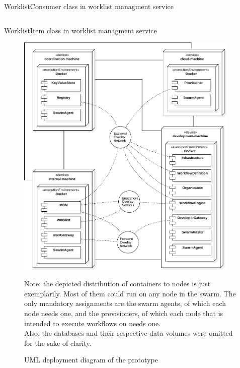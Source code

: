     \begin{listing}[!h]
      \inputminted[fontsize=\footnotesize,linenos=true,numberblanklines=true,showspaces=false,breaklines=true,baselinestretch=1]{ruby}{../code/worklist/consumers/worklist_consumer.rb}
      \caption{WorklistConsumer class in worklist managment service}
    \label{lst:worklist_consumer_in_worklist_managment_service}
    \end{listing}

    \begin{listing}[!h]
      \inputminted[fontsize=\footnotesize,linenos=true,numberblanklines=true,showspaces=false,breaklines=true,baselinestretch=1]{ruby}{../code/worklist/models/worklist_item.rb}
      \caption{WorklistItem class in worklist managment service}
    \label{lst:worklist_item_in_organization_managment_service}
    \end{listing}

\clearpage
{}

  \begin{figure}[htbp]
    \centering
    \includegraphics[width=0.95\textwidth]{content/images/deployment_diagram-crop.pdf}
    \caption*{\scriptsize Note: the depicted distribution of containers to nodes is just exemplarily. Most of them could run on any node in the swarm. The only mandatory assignments are the swarm agents, of which each node needs one, and the provisioners, of which each node that is intended to execute workflows on needs one. \\Also, the databases and their respective data volumes were omitted for the sake of clarity.}
    \caption{UML deployment diagram of the prototype}
    \label{fig:deployment_diagram_of_the_architecture}
  \end{figure}

